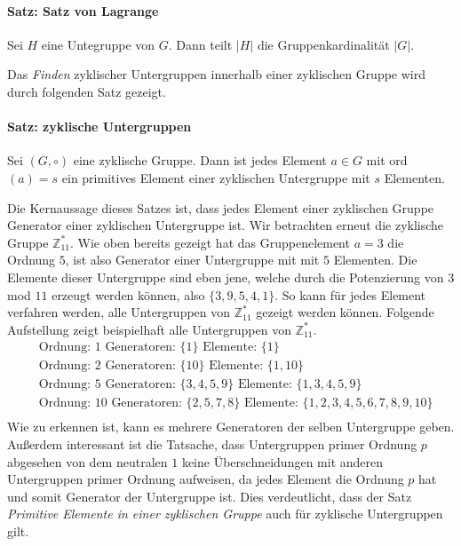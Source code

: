 \paragraph{Satz: Satz von Lagrange}
Sei $H$ eine Untegruppe von $G$. Dann teilt $|H|$ die Gruppenkardinalität $|G|$.

Das \textit{Finden} zyklischer Untergruppen innerhalb einer zyklischen Gruppe wird durch folgenden Satz gezeigt.

\paragraph{Satz: zyklische Untergruppen}
Sei $(G, \circ)$ eine zyklische Gruppe. Dann ist jedes Element $a \in G$ mit ord$(a) = s$ ein primitives Element einer zyklischen Untergruppe mit $s$ Elementen.

Die Kernaussage dieses Satzes ist, dass jedes Element einer zyklischen Gruppe Generator einer zyklischen Untergruppe ist.  Wir betrachten erneut die zyklische Gruppe $\mathbb{Z}^*_{11}$. Wie oben bereits gezeigt hat das Gruppenelement $a=3$ die Ordnung $5$, ist also Generator einer Untergruppe mit mit $5$ Elementen. Die Elemente dieser Untergruppe sind eben jene, welche durch die Potenzierung von $3$ mod $11$ erzeugt werden können, also $\{3,9,5,4,1\}$. So kann für jedes Element verfahren werden, alle Untergruppen von $\mathbb{Z}^*_{11}$ gezeigt werden können. Folgende Aufstellung zeigt beispielhaft alle Untergruppen von $\mathbb{Z}^*_{11}$.
\begin{align*}
&\text{Ordnung: } 1 \text{ Generatoren: } \{1\} \text{ Elemente: }\{1\}\\
&\text{Ordnung: } 2 \text{ Generatoren: } \{10\} \text{ Elemente: }\{1,10\}\\
&\text{Ordnung: } 5 \text{ Generatoren: } \{3,4,5,9\} \text{ Elemente: }\{1,3,4,5,9\}\\
&\text{Ordnung: } 10 \text{ Generatoren: } \{2,5,7,8\} \text{ Elemente: } \{1,2,3,4,5,6,7,8,9,10\}\\
\end{align*}
Wie zu erkennen ist, kann es mehrere Generatoren der selben Untergruppe geben. Außerdem interessant ist die Tatsache, dass Untergruppen primer Ordnung $p$ abgesehen von dem neutralen $1$ keine Überschneidungen mit anderen Untergruppen primer Ordnung aufweisen, da jedes Element die Ordnung $p$ hat und somit Generator der Untergruppe ist. Dies verdeutlicht, dass der Satz \textit{ Primitive Elemente in einer zyklischen Gruppe} auch für zyklische Untergruppen gilt.

